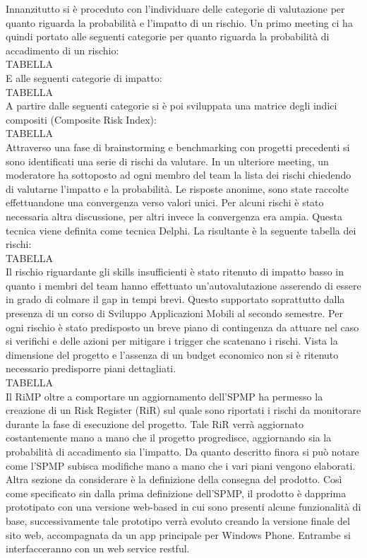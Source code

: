 Innanzitutto si è proceduto con l’individuare delle categorie di valutazione per quanto riguarda la probabilità e l’impatto di un rischio.
Un primo meeting ci ha quindi portato alle seguenti categorie per quanto riguarda la probabilità di accadimento di un rischio:
\\
TABELLA
\\
E alle seguenti categorie di impatto:
\\
TABELLA
\\
A partire dalle seguenti categorie si è poi sviluppata una matrice degli indici compositi (Composite Risk Index):
\\
TABELLA
\\
Attraverso una fase di brainstorming e benchmarking con progetti precedenti si sono identificati una serie di rischi da valutare. 
In un ulteriore meeting, un moderatore ha sottoposto ad ogni membro del team la lista dei rischi chiedendo di valutarne l’impatto e la probabilità. Le risposte anonime, sono state raccolte effettuandone una convergenza verso valori unici.
Per alcuni rischi è stato necessaria altra discussione, per altri invece la convergenza era ampia. Questa tecnica viene definita come tecnica Delphi.
La risultante è la seguente tabella dei rischi:
\\
TABELLA
\\
Il rischio riguardante gli skills insufficienti è stato ritenuto di impatto basso in quanto i membri del team hanno effettuato un’autovalutazione asserendo di essere in grado di colmare il gap in tempi brevi. Questo supportato soprattutto dalla presenza di un corso di Sviluppo Applicazioni Mobili al secondo semestre.
Per ogni rischio è stato predisposto un breve piano di contingenza da attuare nel caso si verifichi e delle azioni per mitigare i trigger che scatenano i rischi. Vista la dimensione del progetto e l’assenza di un budget economico non si è ritenuto necessario predisporre piani dettagliati.
\\
TABELLA
\\
Il RiMP oltre a comportare un aggiornamento dell’SPMP ha permesso la creazione di un Risk Register (RiR) sul quale sono riportati i rischi da monitorare durante la fase di esecuzione del progetto.
Tale RiR verrà aggiornato costantemente mano a mano che il progetto progredisce, aggiornando sia la probabilità di accadimento sia l’impatto.
Da quanto descritto finora si può notare come l’SPMP subisca modifiche mano a mano che i vari piani vengono elaborati. Altra sezione da considerare è la definizione della consegna del prodotto. Così come specificato sin dalla prima definizione dell’SPMP, il prodotto è dapprima prototipato con una versione web-based in cui sono presenti alcune funzionalità di base, successivamente tale prototipo verrà evoluto creando la versione finale del sito web, accompagnata da un app principale per Windows Phone. Entrambe si interfacceranno con un web service restful.

